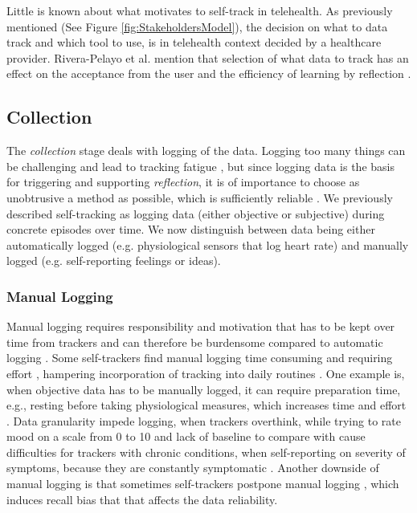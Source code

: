 Little is known about what motivates to self-track in telehealth. As previously mentioned (See Figure \ref{fig:StakeholdersModel}), the decision on what to data track and which tool to use, is in telehealth context decided by a healthcare provider. Rivera-Pelayo et al. mention that selection of what data to track has an effect on the acceptance from the user and the efficiency of learning by reflection \cite{Rivera}.

\subsection{Collection} 
The \textit{collection} stage deals with logging of the data. Logging too many things can be challenging and lead to tracking fatigue \cite{Choe2014, Patel2012}, but since logging data is the basis for triggering and supporting \textit{reflection}, it is of importance to choose as unobtrusive a method as possible, which is sufficiently reliable \cite{Muller}. We previously described self-tracking as logging data (either objective or subjective) during concrete episodes over time. We now distinguish between data being either automatically logged (e.g. physiological sensors that log heart rate) and manually logged (e.g. self-reporting feelings or ideas). 

\subsubsection{Manual Logging}
Manual logging requires responsibility and motivation that has to be kept over time from trackers and can therefore be burdensome compared to automatic logging \cite{Li2010, Muller}. Some self-trackers find manual logging time consuming and requiring effort \cite{Ancker2015}, hampering incorporation of tracking into daily routines \cite{Verdezoto2015, Ancker2015}. One example is, when objective data has to be manually logged, it can require preparation time, e.g., resting before taking physiological measures, which increases time and effort \cite{Verdezoto2015}. Data granularity impede logging, when trackers overthink, while trying to rate mood on a scale from 0 to 10 \cite{Oh2015} and lack of baseline to compare with cause difficulties for trackers with chronic conditions, when self-reporting on severity of symptoms, because they are constantly symptomatic \cite{piloting}. Another downside of manual logging is that sometimes self-trackers postpone manual logging \cite{MacLeod2014}, which induces recall bias that that affects the data reliability. 

